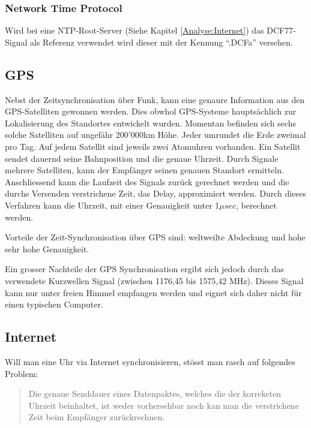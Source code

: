 \subsubsection{Network Time Protocol}
Wird bei eine NTP-Root-Server (Siehe Kapitel \ref{Analyse:Internet}) das DCF77-Signal als Referenz verwendet wird dieser mit der Kennung "`.DCFa"' versehen.

\subsection{GPS}
Nebst der Zeitsynchronisation über Funk, kann eine genaure Information aus den GPS-Satelliten gewonnen werden. Dies obwhol GPS-Systeme hauptsächlich zur Lokalisierung des Standortes entwickelt wurden.
Momentan befinden sich sechs solche Satelliten auf ungefähr 200'000km Höhe. Jeder umrundet die Erde zweimal pro Tag. Auf jedem Satellit sind jeweils zwei Atomuhren vorhanden.
Ein Satellit sendet dauernd seine Bahnposition und die genaue Uhrzeit. Durch Signale mehrere Satelliten, kann der Empfänger seinen genauen Standort ermitteln.
Anschliessend kann die Laufzeit des Signals zurück gerechnet werden und die durchs Versenden verstrichene Zeit, das Delay, approximiert werden.
Durch dieses Verfahren kann die Uhrzeit, mit einer Genauigkeit unter 1${\mu}sec$, berechnet werden.

Vorteile der Zeit-Synchronisation über GPS sind: weltweilte Abdeckung und hohe sehr hohe Genauigkeit.

Ein grosser Nachteile der GPS Synchronisation ergibt sich jedoch durch das verwendete Kurzwellen Signal (zwischen 1176,45 bis 1575,42 MHz). Dieses Signal kann nur unter freien Himmel empfangen werden und eignet sich daher nicht für einen typischen Computer.

\subsection{Internet} \label{Anaylse:Internet}

Will man eine Uhr via Internet synchronisieren, stösst man rasch auf folgendes Problem:

\begin{verse}
Die genaue Senddauer eines  Datenpaktes, welches die der korreketen Uhrzeit beinhaltet, ist weder vorhersehbar noch kan man die verstrichene Zeit beim Empfänger zurückrechnen.
\end{verse}

